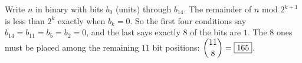 Write $n$ in binary with bits $b_0$ (units) through $b_{14}$. The remainder of $n$ mod $2^{k+1}$ is less than $2^k$ exactly when $b_k=0$. So the first four conditions say $b_{14}=b_{11}=b_5=b_2=0$, and the last says exactly $8$ of the bits are $1$. The $8$ ones must be placed among the remaining $11$ bit positions: $\dbinom{11}{8}=\boxed{165}$.
